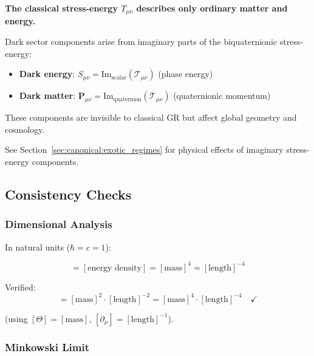 \begin{tcolorbox}[colback=blue!5!white,colframe=blue!75!black,title=Stress-Energy and Dark Sector]
\textbf{The classical stress-energy $T_{\mu\nu}$ describes only ordinary matter and energy.}

Dark sector components arise from imaginary parts of the biquaternionic stress-energy:
\begin{itemize}
    \item \textbf{Dark energy}: $S_{\mu\nu} = \text{Im}_{\text{scalar}}(\mathcal{T}_{\mu\nu})$ (phase energy)
    \item \textbf{Dark matter}: $\mathbf{P}_{\mu\nu} = \text{Im}_{\text{quaternion}}(\mathcal{T}_{\mu\nu})$ (quaternionic momentum)
\end{itemize}

These components are invisible to classical GR but affect global geometry and cosmology.

See Section~\ref{sec:canonical:exotic_regimes} for physical effects of imaginary stress-energy components.
\end{tcolorbox}

\subsection{Consistency Checks}

\subsubsection{Dimensional Analysis}

In natural units ($\hbar = c = 1$):

\begin{equation}
[T_{\mu\nu}] = [\text{energy density}] = [\text{mass}]^4 = [\text{length}]^{-4}
\end{equation}

Verified:
\begin{equation}
[\partial_\mu\Theta \partial_\nu\Theta^\dagger] = [\text{mass}]^2 \cdot [\text{length}]^{-2} = [\text{mass}]^4 \cdot [\text{length}]^{-4} \quad \checkmark
\end{equation}

(using $[\Theta] = [\text{mass}]$, $[\partial_\mu] = [\text{length}]^{-1}$).

\subsubsection{Minkowski Limit}

